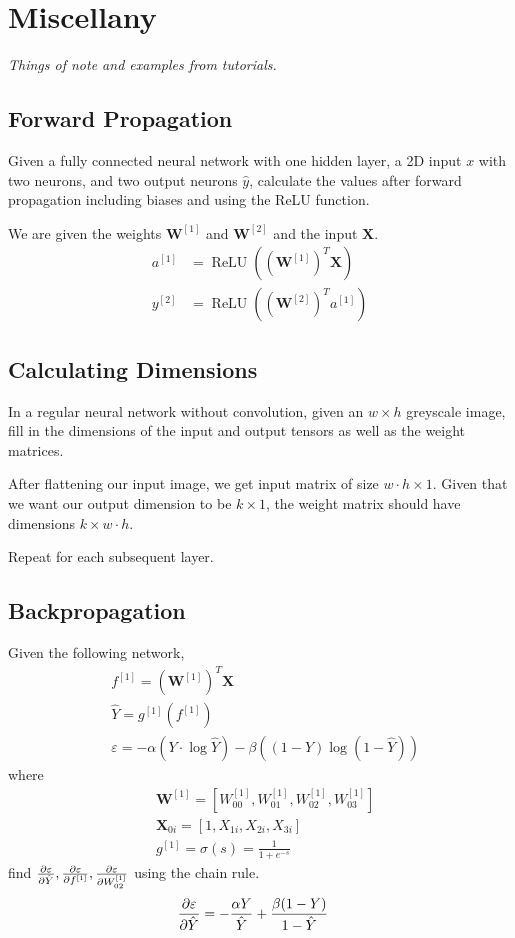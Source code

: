 \section{Miscellany}
\emph{Things of note and examples from tutorials.}

\subsection{Forward Propagation}
Given a fully connected neural network with one hidden layer,
a 2D input $x$ with two neurons, and two output neurons $\hat{y}$, calculate
the values after forward propagation including biases and using the ReLU function.

We are given the weights $\mathbf{W}^{[1]}$ and $\mathbf{W}^{[2]}$
and the input $\mathbf{X}$.
\begin{align*}
    a^{[1]} &= \operatorname{ReLU}\left( \left(\mathbf{W}^{[1]}\right)^T \mathbf{X} \right)\\
    y^{[2]} &= \operatorname{ReLU}\left( \left(\mathbf{W}^{[2]}\right)^T a^{[1]} \right)
\end{align*}

\subsection{Calculating Dimensions}
In a regular neural network without convolution, given an $w \times h$ greyscale image,
fill in the dimensions of the input and output tensors as well as the weight matrices.

After flattening our input image, we get input matrix of size $w \cdot h \times 1$.
Given that we want our output dimension to be $k \times 1$, the weight matrix should
have dimensions $k \times w \cdot h$.

Repeat for each subsequent layer.

\subsection{Backpropagation}
Given the following network,
\begin{align*}
    & f^{[1]} = \left( \mathbf{W}^{[1]} \right) ^T \mathbf{X} \\
    & \hat{Y} = g^{[1]} \left( f^{[1]} \right) \\
    & \varepsilon = - \alpha \left( Y \cdot \log \hat{Y} \right) - \beta \left( (1 - Y) \log (1 - \hat{Y}) \right)
\end{align*} where
\begin{align*}
    & \mathbf{W}^{[1]} = [W_{00}^{[1]}, W_{01}^{[1]}, W_{02}^{[1]}, W_{03}^{[1]}] \\
    & \mathbf{X}_{0i} = [1, X_{1i}, X_{2i}, X_{3i}] \\
    & g^{[1]} = \sigma(s) = \frac{1}{1 + e^{-s}}
\end{align*} find
$\frac{\partial \varepsilon}{\partial \hat{Y}}, \frac{\partial \varepsilon}{\partial f^{[1]}},
\frac{\partial \varepsilon}{\partial W_{02}^{[1]}}$ using the chain rule.
\begin{align*}
    \frac{\partial \varepsilon}{\partial \hat{Y}} 
        &= -\frac{\alpha Y}{\hat{Y}}
        + \frac{\beta(1 - Y)}{1 - \hat{Y}}
\end{align*}

